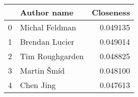 \begin{tabular}{llr}
\toprule
{} &      Author name &  Closeness \\
\midrule
0 &   Michal Feldman &   0.049135 \\
1 &   Brendan Lucier &   0.049014 \\
2 &  Tim Roughgarden &   0.048825 \\
3 &      Martin Šmíd &   0.048100 \\
4 &       Chen  Jing &   0.047613 \\
\bottomrule
\end{tabular}
